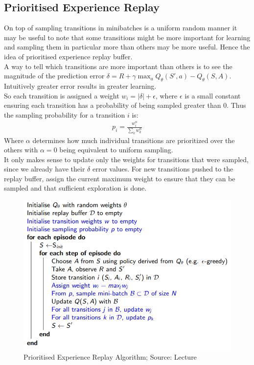 \subsection{Prioritised Experience Replay}

On top of sampling transitions in minibatches is a uniform random manner it may be useful to note that some transitions might be more important for learning and 
sampling them in particular more than others may be more useful. Hence the idea of prioritised experience replay buffer. \\

A way to tell which transitions are more important than others is to see the magnitude of the prediction error $\delta = R + \gamma \max_a Q_{\theta}(S', a) - Q_{\theta}(S, A)$. 
Intuitively greater error results in greater learning.\\

So each transition is assigned a weight $w_i = |\delta| + \epsilon$, where $\epsilon$ is a small constant ensuring each transition has a probability of being sampled greater than 0. Thus the sampling probability for a transition $i$ is:
\begin{align}
    p_i = \frac{w_i^{\alpha}}{\sum_k w^{\alpha}_k}
\end{align}
Where $\alpha$ determines how much individual transitions are prioritized over the others with $\alpha = 0$ being equivalent to uniform sampling.\\

It only makes sense to update only the weights for transitions that were sampled, since we already have their $\delta$ error values. For new transitions pushed to the replay buffer, assign the current maximum weight to ensure that they can be sampled and that sufficient exploration is done.

\begin{figure}[h!]
  \centering
  \includegraphics[scale=0.5]{figures/prioritized_buffer.PNG}
  \caption{Prioritised Experience Replay Algorithm; Source: Lecture}
  \label{fig:replay_buffer}
\end{figure}
\newpage

